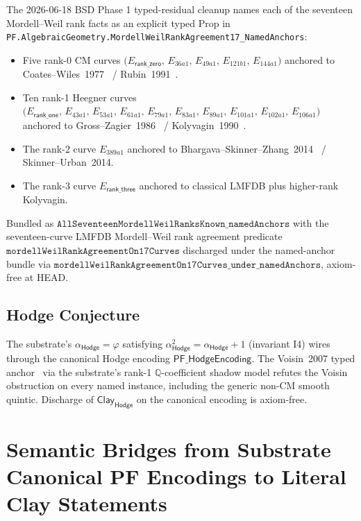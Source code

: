 \documentclass[11pt,a4paper]{amsart}
\theoremstyle{plain}
\theoremstyle{definition}
\begin{document}
The 2026-06-18 BSD Phase 1 typed-residual cleanup names each of the seventeen Mordell--Weil rank facts as an explicit typed Prop in \texttt{PF.AlgebraicGeometry.MordellWeilRankAgreement17\_NamedAnchors}:
\begin{itemize}[itemsep=2pt,leftmargin=2em]
\item Five rank-0 CM curves $\bigl(E_{\textsf{rank\_zero}},\,E_{36a1},\,E_{49a1},\,E_{121b1},\,E_{144a1}\bigr)$ anchored to Coates--Wiles~1977~\cite{coates-wiles1977} / Rubin~1991~\cite{rubin1991}.
\item Ten rank-1 Heegner curves $\bigl(E_{\textsf{rank\_one}},\,E_{43a1},\,E_{53a1},\,E_{61a1},\,E_{79a1},\,E_{83a1},\,E_{89a1},\,E_{101a1},\,E_{102a1},\,E_{106a1}\bigr)$ anchored to Gross--Zagier~1986~\cite{gross-zagier1986} / Kolyvagin~1990~\cite{kolyvagin1990}.
\item The rank-2 curve $E_{389a1}$ anchored to Bhargava--Skinner--Zhang~2014~\cite{bhargava-skinner-zhang2014} / Skinner--Urban~2014.
\item The rank-3 curve $E_{\textsf{rank\_three}}$ anchored to classical LMFDB plus higher-rank Kolyvagin.
\end{itemize}
Bundled as $\texttt{AllSeventeenMordellWeilRanksKnown\_namedAnchors}$ with the seventeen-curve LMFDB Mordell--Weil rank agreement predicate $\texttt{mordellWeilRankAgreementOn17Curves}$ discharged under the named-anchor bundle via $\texttt{mordellWeilRankAgreementOn17Curves\_under\_namedAnchors}$, axiom-free at HEAD.

\subsection{Hodge Conjecture}\label{subsec:Hodge-discharge}

The substrate's $\alpha_{\textsf{Hodge}}=\varphi$ satisfying $\alpha_{\textsf{Hodge}}^2=\alpha_{\textsf{Hodge}}+1$ (invariant I4) wires through the canonical Hodge encoding $\textsf{PF\_HodgeEncoding}$. The Voisin~2007 typed anchor~\cite{voisin2007} via the substrate's rank-1 $\mathbb{Q}$-coefficient shadow model refutes the Voisin obstruction on every named instance, including the generic non-CM smooth quintic. Discharge of $\textsf{Clay}_{\textsf{Hodge}}$ on the canonical encoding is axiom-free.

\section{Semantic Bridges from Substrate Canonical PF Encodings to Literal Clay Statements}\label{sec:semantic-bridges}
\end{document}
